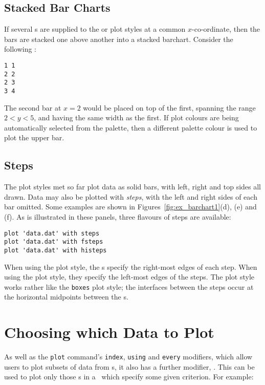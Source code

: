 \subsection{Stacked Bar Charts}

If several \datapoint s are supplied to the  or 
plot styles at a common $x$-co-ordinate, then the bars are stacked one above
another into a stacked barchart. Consider the following \datafile:

\begin{verbatim} 
1 1
2 2
2 3
3 4
\end{verbatim}

\noindent The second bar at $x=2$ would be placed on top of the first, spanning
the range $2<y<5$, and having the same width as the first. If plot colours are
being automatically selected from the palette, then a different palette colour
is used to plot the upper bar.

\subsection{Steps}

The plot styles met so far plot data as solid bars, with left, right and top
sides all drawn. Data may also be plotted with {\it steps}, with the left and
right sides of each bar omitted. Some examples are shown in
Figures~\ref{fig:ex_barchart1}(d), (e) and (f).  As is illustrated in these
panels, three flavours of steps are available:

\begin{verbatim}
plot 'data.dat' with steps 
plot 'data.dat' with fsteps 
plot 'data.dat' with histeps
\end{verbatim}

\noindent When using the  plot style, the \datapoint s specify the
right-most edges of each step. When using the  plot style, they
specify the left-most edges of the steps. The  plot style works
rather like the {\tt boxes} plot style; the interfaces between the steps occur
at the horizontal midpoints between the \datapoint s.

\section{Choosing which Data to Plot}
\label{select_modifier} 
As well as the {\tt plot} command's {\tt index}, {\tt using} and {\tt every}
modifiers, which allow users to plot subsets of data from \datafile s, it also
has a further modifier, . This can be used to plot only those
\datapoint s in a \datafile\ which specify some given criterion. For example:


